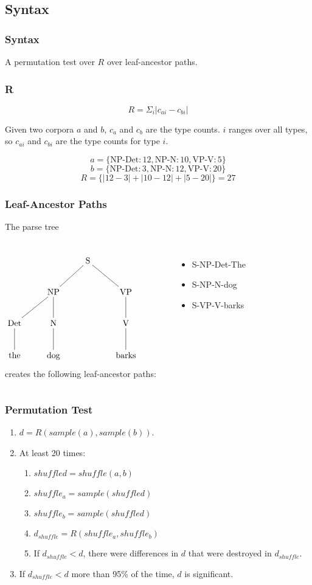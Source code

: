 \documentclass{beamer}
\begin{document}
\subsection{Syntax}
\begin{frame}
\frametitle{Syntax}
  A permutation test over $R$ over leaf-ancestor paths.
\end{frame}
\begin{frame}
\frametitle{R}
\begin{definition}
\begin{equation}
R = \Sigma_i |c_{ai} - c_{bi}|
\label{rmeasure}
\end{equation}
\end{definition}
\noindent{}Given two corpora $a$ and $b$, $c_a$ and $c_b$ are the type
counts. $i$ ranges over all types, so $c_{ai}$ and $c_{bi}$ are the
type counts for type $i$.
  \begin{example}
    \[a=\{\textrm{NP-Det}:12, \textrm{NP-N}:10, \textrm{VP-V}:5\}\]
    \[b=\{\textrm{NP-Det}:3, \textrm{NP-N}:12, \textrm{VP-V}:20\}\]
    \[R = \{|12-3| + |10-12| + |5-20|\} = 27 \]
  \end{example}
\end{frame}
\begin{frame}
  \frametitle{Leaf-Ancestor Paths}
The parse tree
\begin{columns}
\[\xymatrix{
  &&\textrm{S} \ar@{-}[dl] \ar@{-}[dr] &&\\
  &\textrm{NP} \ar@{-}[d] \ar@{-}[dl] &&\textrm{VP} \ar@{-}[d]\\
  \textrm{Det} \ar@{-}[d] & \textrm{N} \ar@{-}[d] && \textrm{V} \ar@{-}[d] \\
\textrm{the}& \textrm{dog} && \textrm{barks}\\}
\]
creates the following leaf-ancestor paths:
\begin{itemize}
\item S-NP-Det-The
\item S-NP-N-dog
\item S-VP-V-barks
\end{itemize}
\end{columns}
\end{frame}
\begin{frame}
  \frametitle{Permutation Test}
  \begin{enumerate}
  \item $d = R(sample(a),sample(b))$.
  \item At least 20 times:
    \begin{enumerate}
    \item $shuffled = shuffle(a,b)$
    \item $shuffle_a = sample(shuffled)$
    \item $shuffle_b = sample(shuffled)$
    \item $d_{shuffle} = R(shuffle_a,shuffle_b)$
    \item If $d_{shuffle} < d$, there were differences in
      $d$ that were destroyed in $d_{shuffle}$.
  \end{enumerate}
  \item If $d_{shuffle} < d$ more than 95\% of the time, $d$ is significant.
  \end{enumerate}
\end{frame}
\end{document}
